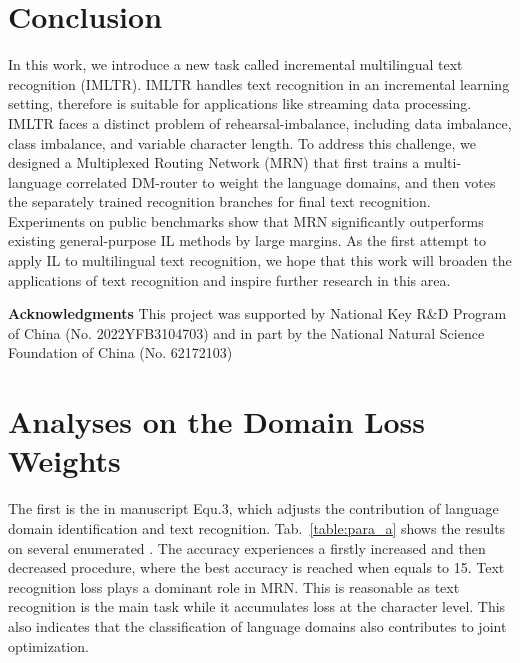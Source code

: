 \documentclass[10pt,twocolumn,letterpaper]{article}
\begin{document}
\section{Conclusion}
In this work, we introduce a new task called incremental multilingual text recognition (IMLTR). IMLTR handles text recognition in an incremental learning setting, therefore is suitable for applications like streaming data processing. IMLTR faces a distinct problem of rehearsal-imbalance, including data imbalance, class imbalance, and variable character length. To address this challenge, we designed a Multiplexed Routing Network (MRN) that first trains a multi-language correlated DM-router to weight the language domains, and then votes the separately trained recognition branches for final text recognition. Experiments on public benchmarks show that MRN significantly outperforms existing general-purpose IL methods by large margins. As the first attempt to apply IL to multilingual text recognition, we hope that this work will broaden the applications of text recognition and inspire further research in this area.


\vspace{0.3cm}
\noindent\textbf{Acknowledgments}
This project was supported by National Key R\&D Program of China (No. 2022YFB3104703) and in part by the National Natural Science Foundation of China (No. 62172103)

{\small


}


\newpage




\ificcvfinal\thispagestyle{empty}\fi




\maketitle
\appendix


\section{Analyses on the Domain Loss Weights}
The first is the  in manuscript Equ.3, which adjusts the contribution of language domain identification and text recognition. Tab.~\ref{table:para_a} shows the results on several enumerated . The accuracy experiences a firstly increased and then decreased procedure, where the best accuracy is reached when  equals to 15. Text recognition loss plays a dominant role in MRN. This is reasonable as text recognition is the main task while it accumulates loss at the character level. This also indicates that the classification of language domains also contributes to joint optimization. 
\end{document}
